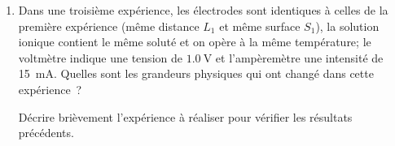 \begin{enumerate}[resume=x]
    \item Dans une troisième expérience, les électrodes sont identiques à celles
          de la première expérience (même distance $L_1$ et même surface $S_1$),
          la solution ionique contient le même soluté et on opère à la même
          température; le voltmètre indique une tension de $\qty{1,0}{\volt}$ et
          l'ampèremètre une intensité de \qty{15}{\mA}. Quelles sont les
          grandeurs physiques qui ont changé dans cette expérience~?

          Décrire brièvement l'expérience à réaliser pour vérifier les résultats
          précédents.
\end{enumerate}
